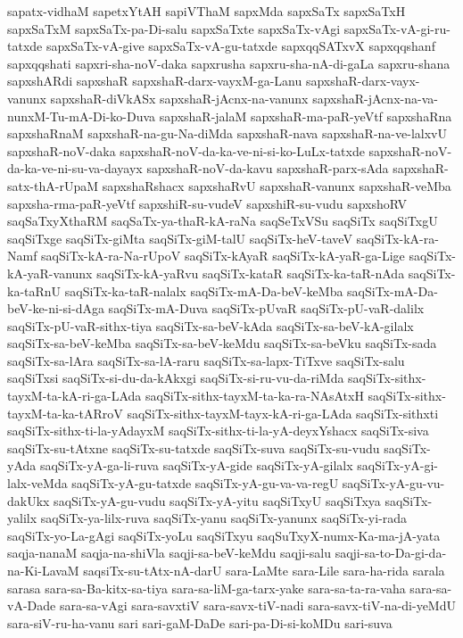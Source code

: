 {sapatx-vidhaM
sapetxYtAH
sapiVThaM
sapxMda
sapxSaTx
sapxSaTxH
sapxSaTxM
sapxSaTx-pa-Di-salu
sapxSaTxte
sapxSaTx-vAgi
sapxSaTx-vA-gi-ru-tatxde
sapxSaTx-vA-give
sapxSaTx-vA-gu-tatxde
sapxqqSATxvX
sapxqqshanf
sapxqqshati
sapxri-sha-noV-daka
sapxrusha
sapxru-sha-nA-di-gaLa
sapxru-shana
sapxshARdi
sapxshaR
sapxshaR-darx-vayxM-ga-Lanu
sapxshaR-darx-vayx-vanunx
sapxshaR-diVkASx
sapxshaR-jAcnx-na-vanunx
sapxshaR-jAcnx-na-va-nunxM-Tu-mA-Di-ko-Duva
sapxshaR-jalaM
sapxshaR-ma-paR-yeVtf
sapxshaRna
sapxshaRnaM
sapxshaR-na-gu-Na-diMda
sapxshaR-nava
sapxshaR-na-ve-lalxvU
sapxshaR-noV-daka
sapxshaR-noV-da-ka-ve-ni-si-ko-LuLx-tatxde
sapxshaR-noV-da-ka-ve-ni-su-va-dayayx
sapxshaR-noV-da-kavu
sapxshaR-parx-sAda
sapxshaR-satx-thA-rUpaM
sapxshaRshacx
sapxshaRvU
sapxshaR-vanunx
sapxshaR-veMba
sapxsha-rma-paR-yeVtf
sapxshiR-su-vudeV
sapxshiR-su-vudu
sapxshoRV
saqSaTxyXthaRM
saqSaTx-ya-thaR-kA-raNa
saqSeTxVSu
saqSiTx
saqSiTxgU
saqSiTxge
saqSiTx-giMta
saqSiTx-giM-talU
saqSiTx-heV-taveV
saqSiTx-kA-ra-Namf
saqSiTx-kA-ra-Na-rUpoV
saqSiTx-kAyaR
saqSiTx-kA-yaR-ga-Lige
saqSiTx-kA-yaR-vanunx
saqSiTx-kA-yaRvu
saqSiTx-kataR
saqSiTx-ka-taR-nAda
saqSiTx-ka-taRnU
saqSiTx-ka-taR-nalalx
saqSiTx-mA-Da-beV-keMba
saqSiTx-mA-Da-beV-ke-ni-si-dAga
saqSiTx-mA-Duva
saqSiTx-pUvaR
saqSiTx-pU-vaR-dalilx
saqSiTx-pU-vaR-sithx-tiya
saqSiTx-sa-beV-kAda
saqSiTx-sa-beV-kA-gilalx
saqSiTx-sa-beV-keMba
saqSiTx-sa-beV-keMdu
saqSiTx-sa-beVku
saqSiTx-sada
saqSiTx-sa-lAra
saqSiTx-sa-lA-raru
saqSiTx-sa-lapx-TiTxve
saqSiTx-salu
saqSiTxsi
saqSiTx-si-du-da-kAkxgi
saqSiTx-si-ru-vu-da-riMda
saqSiTx-sithx-tayxM-ta-kA-ri-ga-LAda
saqSiTx-sithx-tayxM-ta-ka-ra-NAsAtxH
saqSiTx-sithx-tayxM-ta-ka-tARroV
saqSiTx-sithx-tayxM-tayx-kA-ri-ga-LAda
saqSiTx-sithxti
saqSiTx-sithx-ti-la-yAdayxM
saqSiTx-sithx-ti-la-yA-deyxYshacx
saqSiTx-siva
saqSiTx-su-tAtxne
saqSiTx-su-tatxde
saqSiTx-suva
saqSiTx-su-vudu
saqSiTx-yAda
saqSiTx-yA-ga-li-ruva
saqSiTx-yA-gide
saqSiTx-yA-gilalx
saqSiTx-yA-gi-lalx-veMda
saqSiTx-yA-gu-tatxde
saqSiTx-yA-gu-va-va-regU
saqSiTx-yA-gu-vu-dakUkx
saqSiTx-yA-gu-vudu
saqSiTx-yA-yitu
saqSiTxyU
saqSiTxya
saqSiTx-yalilx
saqSiTx-ya-lilx-ruva
saqSiTx-yanu
saqSiTx-yanunx
saqSiTx-yi-rada
saqSiTx-yo-La-gAgi
saqSiTx-yoLu
saqSiTxyu
saqSuTxyX-numx-Ka-ma-jA-yata
saqja-nanaM
saqja-na-shiVla
saqji-sa-beV-keMdu
saqji-salu
saqji-sa-to-Da-gi-da-na-Ki-LavaM
saqsiTx-su-tAtx-nA-darU
sara-LaMte
sara-Lile
sara-ha-rida
sarala
sarasa
sara-sa-Ba-kitx-sa-tiya
sara-sa-liM-ga-tarx-yake
sara-sa-ta-ra-vaha
sara-sa-vA-Dade
sara-sa-vAgi
sara-savxtiV
sara-savx-tiV-nadi
sara-savx-tiV-na-di-yeMdU
sara-siV-ru-ha-vanu
sari
sari-gaM-DaDe
sari-pa-Di-si-koMDu
sari-suva
}
